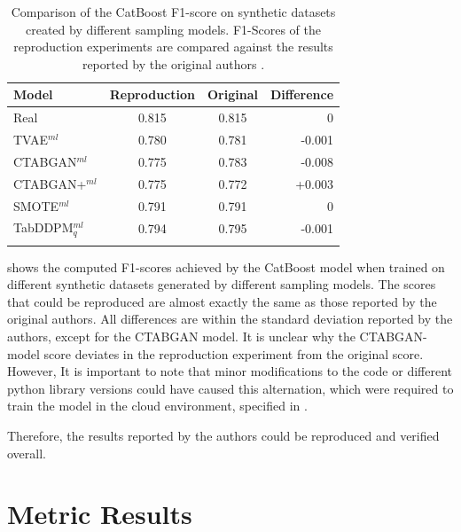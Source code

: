 \begin{table}[h]
	\centering
	\begin{tabular}{lccr}
		\toprule
		\textbf{Model}     & \textbf{Reproduction} & \textbf{Original} & \textbf{Difference} \\
		\midrule
		Real               & 0.815                 & 0.815             & 0                   \\
		TVAE$^{ml}$        & 0.780                 & 0.781             & -0.001              \\
		CTABGAN$^{ml}$     & 0.775                 & 0.783             & -0.008              \\
		CTABGAN+$^{ml}$    & 0.775                 & 0.772             & +0.003              \\
		SMOTE$^{ml}$       & 0.791                 & 0.791             & 0                   \\
		TabDDPM$^{ml}_{q}$ & 0.794                 & 0.795             & -0.001              \\
		\bottomrule
		\multicolumn{4}{c}{}\\[-0.6em]
	\end{tabular}
	\caption[Reproduction Original Results]{Comparison of the CatBoost F1-score on synthetic datasets created by different sampling models.
		F1-Scores of the reproduction experiments are compared against the results reported by the original authors \cite[Table 4, p. 8]{kotelnikov2022TabDDPMModellingTabular}.}
	\label{tab:reproduction}
\end{table}

 shows the computed F1-scores achieved by the CatBoost model when trained on different synthetic datasets generated by different sampling models.
The scores that could be reproduced are almost exactly the same as those reported by the original authors.
All differences are within the standard deviation reported by the authors, except for the CTABGAN model.
It is unclear why the CTABGAN-model score deviates in the reproduction experiment from the original score.
However, It is important to note that minor modifications to the code or different python library versions could have caused this alternation, which were required to train the model in the cloud environment, specified in .

Therefore, the results reported by the authors could be reproduced and verified overall.

\section{Metric Results}
\label{ch:results-Metric-results}

